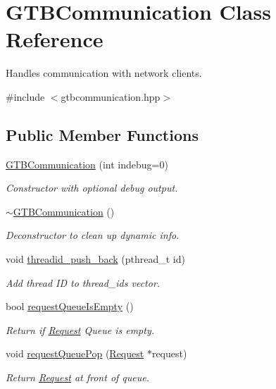 \hypertarget{classGTBCommunication}{\section{G\-T\-B\-Communication Class Reference}
\label{classGTBCommunication}
}


Handles communication with network clients.  




{\ttfamily \#include $<$gtbcommunication.\-hpp$>$}

\subsection*{Public Member Functions}
\begin{DoxyCompactItemize}
\item 
\hyperlink{classGTBCommunication_ad9935001e2ac8454f6a0846bd3f4c78e}{G\-T\-B\-Communication} (int indebug=0)
\begin{DoxyCompactList}\small\item\em Constructor with optional debug output. \end{DoxyCompactList}\item 
\hyperlink{classGTBCommunication_a9a4c0590a68d27986420d573476857f8}{$\sim$\-G\-T\-B\-Communication} ()
\begin{DoxyCompactList}\small\item\em Deconstructor to clean up dynamic info. \end{DoxyCompactList}\item 
void \hyperlink{classGTBCommunication_af5282092ab76fe8130a92f234688f959}{threadid\-\_\-push\-\_\-back} (pthread\-\_\-t id)
\begin{DoxyCompactList}\small\item\em Add thread I\-D to thread\-\_\-ids vector. \end{DoxyCompactList}\item 
bool \hyperlink{classGTBCommunication_a758bba4abe39f43cf8f10f7c12de33b3}{request\-Queue\-Is\-Empty} ()
\begin{DoxyCompactList}\small\item\em Return if \hyperlink{classRequest}{Request} Queue is empty. \end{DoxyCompactList}\item 
void \hyperlink{classGTBCommunication_ac9f8f014e6c5b9c1e1819cb631138d73}{request\-Queue\-Pop} (\hyperlink{classRequest}{Request} $\ast$request)
\begin{DoxyCompactList}\small\item\em Return \hyperlink{classRequest}{Request} at front of queue. \end{DoxyCompactList}\item 

\end{DoxyCompactItemize}
